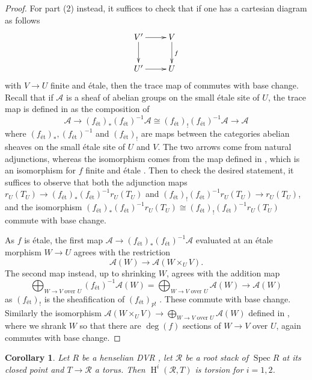 \documentclass{amsart}
\newtheorem{corollary}[corollary]{Corollary}
\theoremstyle{definition}
\newcommand{\oH}{\operatorname{H}}
\newcommand{\cR}{\mathcal{R}}
\newcommand{\cA}{\mathcal{A}}
\newcommand{\spec}{\operatorname{Spec}}
\begin{document}
\begin{proof}
 For part (2) instead, it suffices to check that if one has a cartesian diagram as follows
 \[
 \xymatrix{V' \ar[r]\ar[d]&V\ar[d]^f \\ U'\ar[r]&U}
 \]
with $V\to U$ finite and \'etale, then the trace map of \cite[\href{https://stacks.math.columbia.edu/tag/03SH}{Tag 03SH}]{stacks-project} commutes with base change. Recall that if $\cA$ is a sheaf of abelian groups on the small \'etale site of $U$, the trace map is defined in \cite[\href{https://stacks.math.columbia.edu/tag/03SH}{Tag 03SH}]{stacks-project} as the composition of 
\[\cA\to (f_{\text{\'et}})_*(f_{\text{\'et}})^{-1}\cA\cong (f_{\text{\'et}})_!(f_{\text{\'et}})^{-1}\cA\to \cA\]
where $(f_{\text{\'et}})_*, (f_{\text{\'et}})^{-1}$ and $(f_{\text{\'et}})_!$ are maps between the categories abelian sheaves on the small \'etale site of $U$ and $V$. The two arrows come from natural adjunctions, whereas the isomorphism comes from the map defined in \cite[\href{https://stacks.math.columbia.edu/tag/0F4L}{Tag 0F4L}]{stacks-project}, which is an isomorphism for $f$ finite and \'etale \cite[\href{https://stacks.math.columbia.edu/tag/03S7}{Tag 03S7}]{stacks-project}. Then to check the desired statement, it suffices to observe that both the adjunction maps $r_U(T_U)\to (f_{\text{\'et}})_*(f_{\text{\'et}})^{-1}r_U(T_U)$ and $(f_{\text{\'et}})_!(f_{\text{\'et}})^{-1}r_U(T_U)\to r_U(T_U)$, and the isomorphism $(f_{\text{\'et}})_*(f_{\text{\'et}})^{-1}r_U(T_U)\cong (f_{\text{\'et}})_!(f_{\text{\'et}})^{-1}r_U(T_U)$ commute with base change.

As $f$ is \'etale, the first map $\cA\to (f_{\text{\'et}})_*(f_{\text{\'et}})^{-1}\cA$ evaluated at an \'etale morphism $W\to U$ agrees with the restriction \[\cA(W)\to \cA(W\times_UV).\] The second map instead, up to shrinking $W$, agrees with the addition map \[\bigoplus_{W\to V\text{ over }U}(f_{\text{\'et}})^{-1}\cA(W) = \bigoplus_{W\to V\text{ over }U}\cA(W)\to \cA(W)\]
as $(f_{\text{\'et}})_!$ is the sheafification of $(f_{\text{\'et}})_{p!}$ \cite[\href{https://stacks.math.columbia.edu/tag/03S2}{Tag 03S2}]{stacks-project}.
These commute with base change. Similarly the isomorphism $\cA(W\times_UV)\to \bigoplus_{W\to V\text{ over }U}\cA(W)$ defined in \cite[\href{https://stacks.math.columbia.edu/tag/0F4L}{Tag 0F4L}]{stacks-project}, where we shrank $W$ so that there are $\deg(f)$ sections of $W\to V$ over $U$, again commutes with base change.
\end{proof}
\begin{corollary}\label{cor:Hitorsionrootstack}
    Let $R$ be a henselian DVR , let $\cR$ be a root stack of $\spec R$ at its closed point and $T\to \cR$ a torus. Then $\oH^i(\cR,T)$ is torsion for $i=1,2$.
\end{corollary}
\end{document}
